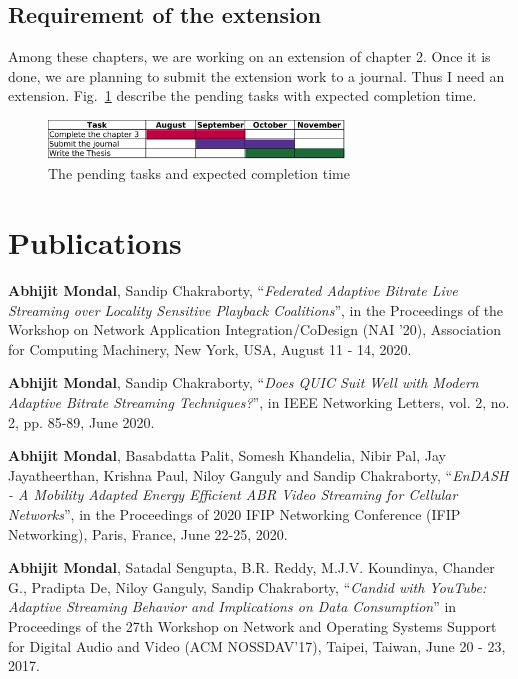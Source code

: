\subsection{Requirement of the extension}
Among these chapters, we are working on an extension of chapter 2. Once it is done, we are planning to submit the extension work to a journal. Thus I need an extension. Fig.~\ref{fig:pendingtask} describe the pending tasks with expected completion time.
 \begin{figure}[h]
	\centering
	\includegraphics[width = 0.7\textwidth]{figures/chart}
	\caption{The pending tasks and expected completion time}
	\label{fig:pendingtask}
\end{figure}

\section*{Publications}
\begin{enumerate}[start=1,label={[\arabic*]}]
	\item \textbf{Abhijit Mondal}, Sandip Chakraborty, ``\textit{Federated Adaptive Bitrate Live Streaming over Locality Sensitive Playback Coalitions}”, in the Proceedings of the Workshop on Network Application Integration/CoDesign (NAI '20), Association for Computing Machinery, New York, USA, August 11 - 14, 2020. 
	\item \textbf{Abhijit Mondal}, Sandip Chakraborty, ``\textit{Does QUIC Suit Well with Modern Adaptive Bitrate Streaming Techniques?}”, in IEEE Networking Letters, vol. 2, no. 2, pp. 85-89, June 2020.
	\item \textbf{Abhijit Mondal}, Basabdatta Palit, Somesh Khandelia, Nibir Pal, Jay Jayatheerthan, Krishna Paul, Niloy Ganguly and Sandip Chakraborty, ``\textit{EnDASH - A Mobility Adapted Energy Efficient ABR Video Streaming for Cellular Networks}'', in the Proceedings of 2020 IFIP Networking Conference (IFIP Networking), Paris, France, June 22-25, 2020.
	\item \textbf{Abhijit Mondal}, Satadal Sengupta, B.R. Reddy, M.J.V. Koundinya, Chander G., Pradipta De, Niloy Ganguly, Sandip Chakraborty, ``\textit{Candid with YouTube: Adaptive Streaming Behavior and Implications on Data Consumption}'' in Proceedings of the 27th Workshop on Network and Operating Systems Support for Digital Audio and Video (ACM NOSSDAV’17), Taipei, Taiwan, June 20 - 23, 2017.
\end{enumerate}